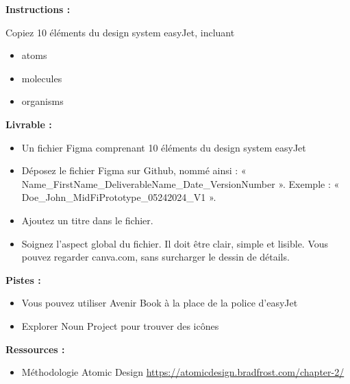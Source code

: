 \makeheaderfiles

\textbf{Instructions :}

Copiez 10 éléments du design system easyJet, incluant

\begin{itemize}
\item atoms
\item molecules
\item organisms
\end{itemize}

\textbf{Livrable :}

\begin{itemize}
\item Un fichier Figma comprenant 10 éléments du design system easyJet
\item Déposez le fichier Figma sur Github, nommé ainsi : « Name\_FirstName\_DeliverableName\_Date\_VersionNumber ». Exemple : « Doe\_John\_MidFiPrototype\_05242024\_V1 ».
\item Ajoutez un titre dans le fichier.
\item Soignez l'aspect global du fichier. Il doit être clair, simple et lisible. Vous pouvez regarder canva.com, sans surcharger le dessin de détails.
\end{itemize}

\textbf{Pistes :}

\begin{itemize}
\item Vous pouvez utiliser Avenir Book à la place de la police d'easyJet
\item Explorer Noun Project pour trouver des icônes
\end{itemize}

\textbf{Ressources :}

\begin{itemize}
\item Méthodologie Atomic Design \url{https://atomicdesign.bradfrost.com/chapter-2/}
\end{itemize}

